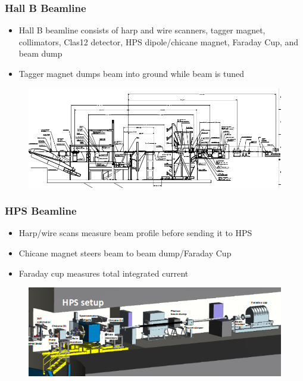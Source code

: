 \documentclass{beamer}
\begin{document}


\begin{frame}
\frametitle{Hall B Beamline}
\begin{itemize}
\item Hall B beamline consists of harp and wire scanners, tagger magnet, collimators, Clas12 detector, HPS dipole/chicane magnet, Faraday Cup, and beam dump
\item Tagger magnet dumps beam into ground while beam is tuned
\end{itemize}
\begin{figure}
\includegraphics[width=1.00\linewidth]{figs/tagger.png}
\end{figure}

\end{frame}


\begin{frame}
\frametitle{HPS Beamline}
\begin{itemize}
\item Harp/wire scans measure beam profile before sending it to HPS
\item Chicane magnet steers beam to beam dump/Faraday Cup
\item Faraday cup measures total integrated current
\end{itemize}
\begin{figure}
\includegraphics[width=1.00\linewidth]{figs/HPS_beamline.png}
\end{figure}

\end{frame}
\end{document}
